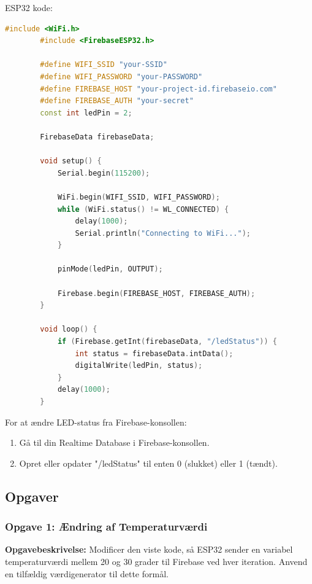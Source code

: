 \documentclass[12pt,a4paper]{book}
\begin{document}
	ESP32 kode:
	\begin{lstlisting}[language=C++, caption=ESP32 kode til modtagelse af LED status fra Firebase RTDB]
		#include <WiFi.h>
		#include <FirebaseESP32.h>
		
		#define WIFI_SSID "your-SSID"
		#define WIFI_PASSWORD "your-PASSWORD"
		#define FIREBASE_HOST "your-project-id.firebaseio.com"
		#define FIREBASE_AUTH "your-secret"
		const int ledPin = 2;
		
		FirebaseData firebaseData;
		
		void setup() {
			Serial.begin(115200);
			
			WiFi.begin(WIFI_SSID, WIFI_PASSWORD);
			while (WiFi.status() != WL_CONNECTED) {
				delay(1000);
				Serial.println("Connecting to WiFi...");
			}
			
			pinMode(ledPin, OUTPUT);
			
			Firebase.begin(FIREBASE_HOST, FIREBASE_AUTH);
		}
		
		void loop() {
			if (Firebase.getInt(firebaseData, "/ledStatus")) {
				int status = firebaseData.intData();
				digitalWrite(ledPin, status);
			}
			delay(1000);
		}
	\end{lstlisting}
	
	For at ændre LED-status fra Firebase-konsollen:
	\begin{enumerate}
		\item Gå til din Realtime Database i Firebase-konsollen.
		\item Opret eller opdater "/ledStatus" til enten 0 (slukket) eller 1 (tændt).
	\end{enumerate}
	
	\subsection*{Opgaver}
	
	\subsubsection{Opgave 1: Ændring af Temperaturværdi}
	
	\textbf{Opgavebeskrivelse:} Modificer den viste kode, så ESP32 sender en variabel temperaturværdi mellem 20 og 30 grader til Firebase ved hver iteration. Anvend en tilfældig værdigenerator til dette formål.
	
\end{document}
